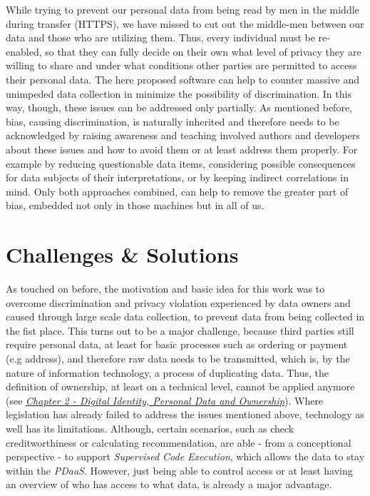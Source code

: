 \documentclass[12pt,english,a4paper,titlepage,cleardoublepage=empty,dottedtoc]{report}
\begin{document}
While trying to prevent our personal data from being read by men in the
middle during transfer (HTTPS), we have missed to cut out the middle-men
between our data and those who are utilizing them. Thus, every
individual must be re-enabled, so that they can fully decide on their
own what level of privacy they are willing to share and under what
conditions other parties are permitted to access their personal data.
The here proposed software can help to counter massive and unimpeded
data collection in minimize the possibility of discrimination. In this
way, though, these issues can be addressed only partially. As mentioned
before, bias, causing discrimination, is naturally inherited and
therefore needs to be acknowledged by raising awareness and teaching
involved authors and developers about these issues and how to avoid them
or at least address them properly. For example by reducing questionable
data items, considering possible consequences for data subjects of their
interpretations, or by keeping indirect correlations in mind. Only both
approaches combined, can help to remove the greater part of bias,
embedded not only in those machines but in all of us.

\section{Challenges \& Solutions}\label{challenges-solutions}

As touched on before, the motivation and basic idea for this work was to
overcome discrimination and privacy violation experienced by data owners
and caused through large scale data collection, to prevent data from
being collected in the fist place. This turns out to be a major
challenge, because third parties still require personal data, at least
for basic processes such as ordering or payment (e.g address), and
therefore raw data needs to be transmitted, which is, by the nature of
information technology, a process of duplicating data. Thus, the
definition of ownership, at least on a technical level, cannot be
applied anymore (see \emph{\protect\hyperlink{def--ownership}{Chapter 2
- Digital Identity, Personal Data and Ownership}}). Where legislation
has already failed to address the issues mentioned above, technology as
well has its limitations. Although, certain scenarios, such as check
creditworthiness or calculating recommendation, are able - from a
conceptional perspective - to support \emph{Supervised Code Execution},
which allows the data to stay within the \emph{PDaaS}. However, just
being able to control access or at least having an overview of who has
access to what data, is already a major advantage.
\end{document}
